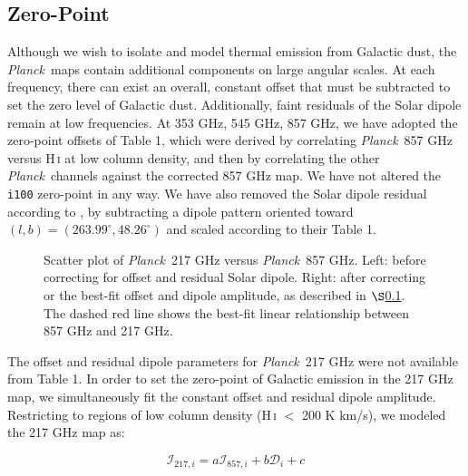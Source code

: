 \documentclass{emulateapj}
\newcommand{\PLANCK}{{\it Planck}}
\begin{document}
\subsection{Zero-Point}
\label{sec:zp}
Although we wish to isolate and model thermal emission from Galactic dust, the
\PLANCK~maps contain additional components on large angular scales. At each 
frequency, there can exist an overall, constant offset that must be subtracted 
to set the zero level of Galactic dust. Additionally, faint residuals of the 
Solar dipole remain at low frequencies. At 353 GHz, 545 GHz, 857 GHz, we have 
adopted the zero-point offsets of \cite{planckdust} Table 1, which were derived
 by correlating \PLANCK~857 GHz versus H\,\textsc{i} at low column density, and
then by correlating the other \PLANCK~channels against the corrected 857 GHz 
map. We have not altered the \verb|i100| zero-point in any way. We have also 
removed the Solar dipole residual according to \cite{planckdust}, by 
subtracting a dipole pattern oriented toward 
$(l, b) = (263.99^{\circ}, 48.26^{\circ})$ and scaled according to their 
Table 1.

\begin{figure}
\begin{center}
\caption{\label{fig:scatter} Scatter plot of \PLANCK~217 GHz versus \PLANCK~857
GHz. Left: before correcting for offset and residual Solar dipole. Right: after
correcting or the best-fit offset and dipole amplitude, as described in 
$\S$\ref{sec:zp}. The dashed red line shows the best-fit linear relationship
between 857 GHz and 217 GHz.}
\end{center}
\end{figure}

The offset and residual dipole parameters for \PLANCK~217 GHz were not 
available from \cite{planckdust} Table 1. In order to set the zero-point of 
Galactic emission in the 217 GHz map, we simultaneously fit the constant 
offset and residual dipole amplitude. Restricting to regions of low column 
density (H\,\textsc{i} $<$ 200 K km/s), we modeled the 217 GHz map as:


\begin{equation}
\mathcal{I}_{217, i} = a\mathcal{I}_{857, i} + b\mathcal{D}_{i} + c
\end{equation}
\end{document}
